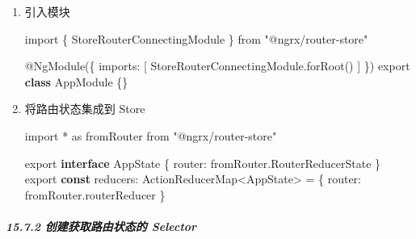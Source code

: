 \documentclass[
]{article}
\newenvironment{Shaded}{}{}
\newcommand{\AttributeTok}[1]{\textcolor[rgb]{0.49,0.56,0.16}{#1}}
\newcommand{\DataTypeTok}[1]{\textcolor[rgb]{0.56,0.13,0.00}{#1}}
\newcommand{\FunctionTok}[1]{\textcolor[rgb]{0.02,0.16,0.49}{#1}}
\newcommand{\ImportTok}[1]{#1}
\newcommand{\KeywordTok}[1]{\textcolor[rgb]{0.00,0.44,0.13}{\textbf{#1}}}
\newcommand{\NormalTok}[1]{#1}
\newcommand{\OperatorTok}[1]{\textcolor[rgb]{0.40,0.40,0.40}{#1}}
\newcommand{\StringTok}[1]{\textcolor[rgb]{0.25,0.44,0.63}{#1}}
\begin{document}
\begin{enumerate}
\def\labelenumi{\arabic{enumi}.}
\item
  引入模块

\begin{Shaded}
\begin{Highlighting}[]
\ImportTok{import}\NormalTok{ \{ StoreRouterConnectingModule \} }\ImportTok{from} \StringTok{"@ngrx/router{-}store"}

\NormalTok{@}\FunctionTok{NgModule}\NormalTok{(\{}
  \DataTypeTok{imports}\OperatorTok{:}\NormalTok{ [}
\NormalTok{    StoreRouterConnectingModule}\OperatorTok{.}\FunctionTok{forRoot}\NormalTok{()}
\NormalTok{  ]}
\NormalTok{\})}
\ImportTok{export} \KeywordTok{class}\NormalTok{ AppModule \{\}}
\end{Highlighting}
\end{Shaded}
\item
  将路由状态集成到 Store

\begin{Shaded}
\begin{Highlighting}[]
\ImportTok{import} \OperatorTok{*} \ImportTok{as}\NormalTok{ fromRouter }\ImportTok{from} \StringTok{"@ngrx/router{-}store"}

\ImportTok{export} \KeywordTok{interface}\NormalTok{ AppState \{}
  \DataTypeTok{router}\OperatorTok{:}\NormalTok{ fromRouter}\OperatorTok{.}\AttributeTok{RouterReducerState}
\NormalTok{\}}
\ImportTok{export} \KeywordTok{const}\NormalTok{ reducers}\OperatorTok{:}\NormalTok{ ActionReducerMap}\OperatorTok{\textless{}}\NormalTok{AppState}\OperatorTok{\textgreater{}} \OperatorTok{=}\NormalTok{ \{}
  \DataTypeTok{router}\OperatorTok{:}\NormalTok{ fromRouter}\OperatorTok{.}\AttributeTok{routerReducer}
\NormalTok{\}}
\end{Highlighting}
\end{Shaded}
\end{enumerate}

\hypertarget{1572-ux521bux5efaux83b7ux53d6ux8defux7531ux72b6ux6001ux7684-selector}{%
\subparagraph{15.7.2 创建获取路由状态的
Selector}\label{1572-ux521bux5efaux83b7ux53d6ux8defux7531ux72b6ux6001ux7684-selector}}
\end{document}
